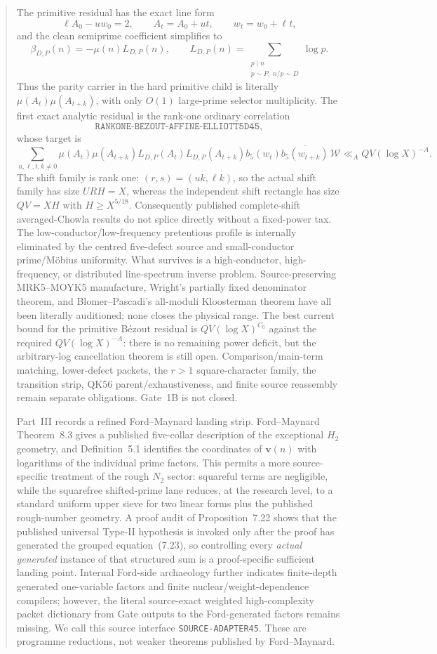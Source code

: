 \documentclass[11pt]{article}
\theoremstyle{definition}
\newcommand{\1}{\mathbf 1}
\begin{document}
\begin{abstract}
The primitive residual has the exact line form
\[
 \ell A_0-u w_0=2,\qquad
 A_t=A_0+ut,\qquad w_t=w_0+\ell t,
\]
and the clean semiprime coefficient simplifies to
\[
 \beta_{D,P}(n)=-\mu(n)L_{D,P}(n),\qquad
 L_{D,P}(n)=\sum_{\substack{p\mid n\\p\sim P,\ n/p\sim D}}\log p.
\]
Thus the parity carrier in the hard primitive child is literally
$\mu(A_t)\mu(A_{t+k})$, with only $O(1)$ large-prime selector multiplicity.
The first exact analytic residual is the rank-one ordinary correlation
\[
 \boxed{\texttt{RANKONE-BEZOUT-AFFINE-ELLIOTT5D45}},
\]
whose target is
\[
 \sum_{u,\ell,t,k\ne0}
 \mu(A_t)\mu(A_{t+k})
 L_{D,P}(A_t)L_{D,P}(A_{t+k})
 b_5(w_t)\overline{b_5(w_{t+k})}\,\mathcal W
 \ll_A QV(\log X)^{-A}.
\]
The shift family is rank one: $(r,s)=(uk,\ell k)$, so the actual shift family
has size $URH=X$, whereas the independent shift rectangle has size
$QV=XH$ with $H\ge X^{5/18}$.  Consequently published complete-shift
averaged-Chowla results do not splice directly without a fixed-power tax.
The low-conductor/low-frequency pretentious profile is internally eliminated
by the centred five-defect source and small-conductor prime/M\"obius
uniformity.  What survives is a high-conductor, high-frequency, or distributed
line-spectrum inverse problem.  Source-preserving MRK5--MOYK5 manufacture,
Wright's partially fixed denominator theorem, and Blomer--Pascadi's all-moduli
Kloosterman theorem have all been literally auditioned; none closes the
physical range.  The best current bound for the primitive B\'ezout residual is
$QV(\log X)^{C_0}$ against the required $QV(\log X)^{-A}$: there is no
remaining power deficit, but the arbitrary-log cancellation theorem is still
open.  Comparison/main-term matching, lower-defect packets, the $r>1$
square-character family, the transition strip, QK56 parent/exhaustiveness,
and finite source reassembly remain separate obligations.  Gate~1B is not
closed.

Part~III records a refined Ford--Maynard landing strip.  Ford--Maynard
Theorem~8.3 gives a published five-collar description of the exceptional
$H_2$ geometry, and Definition~5.1 identifies the coordinates of $\mathbf v(n)$
with logarithms of the individual prime factors.  This permits a more
source-specific treatment of the rough $N_2$ sector: squareful terms are
negligible, while the squarefree shifted-prime lane reduces, at the research
level, to a standard uniform upper sieve for two linear forms plus the published
rough-number geometry.  A proof audit of Proposition~7.22 shows that the
published universal Type-II hypothesis is invoked only after the proof has
generated the grouped equation~(7.23), so controlling every \emph{actual
generated} instance of that structured sum is a proof-specific sufficient
landing point.  Internal Ford-side archaeology further indicates finite-depth
generated one-variable factors and finite nuclear/weight-dependence compilers;
however, the literal source-exact weighted high-complexity packet dictionary
from Gate outputs to the Ford-generated factors remains missing.  We call this
source interface \texttt{SOURCE-ADAPTER45}.  These are programme reductions,
not weaker theorems published by Ford--Maynard.


\end{abstract}
\end{document}
